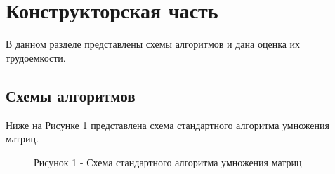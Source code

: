 \documentclass[12pt]{report}
\begin{document}
	\chapter{Конструкторская часть}
	В данном разделе представлены схемы алгоритмов и дана оценка их трудоемкости.
	
	\section{Схемы алгоритмов}
	Ниже на Рисунке 1 представлена схема стандартного алгоритма умножения матриц.
	\begin{figure}[h!]
		\caption*{Рисунок 1 - Схема стандартного алгоритма умножения матриц}
	\end{figure}
	
\end{document}
